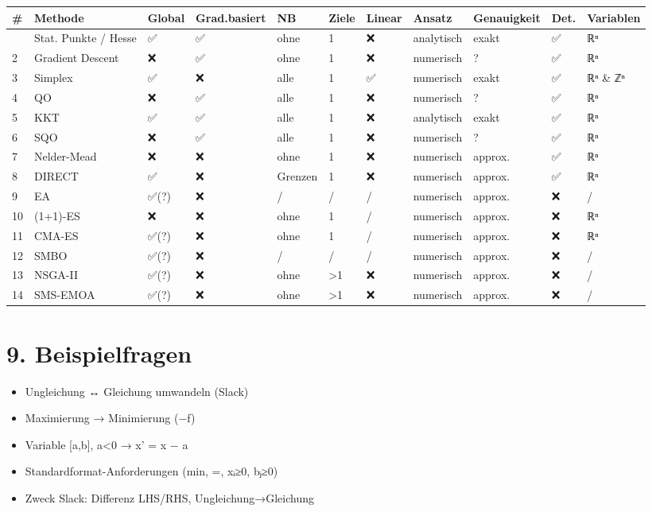 \documentclass[11pt, a4paper]{article}
\begin{document}
\begin{landscape}

{\scriptsize
\begin{tabularx}{\linewidth}{XXXXXXXXXXX}
\hline
\rowcolor{tableheadbg}
{\color{white}\textbf{\#}} & {\color{white}\textbf{Methode}} & {\color{white}\textbf{Global}} & {\color{white}\textbf{Grad.basiert}} & {\color{white}\textbf{NB}} & {\color{white}\textbf{Ziele}} & {\color{white}\textbf{Linear}} & {\color{white}\textbf{Ansatz}} & {\color{white}\textbf{Genauigkeit}} & {\color{white}\textbf{Det.}} & {\color{white}\textbf{Variablen}} \\[2pt]
\hline
\endhead
\hline
\endfoot
1 & Stat. Punkte / Hesse & ✅ & ✅ & ohne & 1 & ❌ & analytisch & exakt & ✅ & ℝⁿ \\
2 & Gradient Descent & ❌ & ✅ & ohne & 1 & ❌ & numerisch & ? & ✅ & ℝⁿ \\
3 & Simplex & ✅ & ❌ & alle & 1 & ✅ & numerisch & exakt & ✅ & ℝⁿ \& ℤⁿ \\
4 & QO & ❌ & ✅ & alle & 1 & ❌ & numerisch & ? & ✅ & ℝⁿ \\
5 & KKT & ✅ & ✅ & alle & 1 & ❌ & analytisch & exakt & ✅ & ℝⁿ \\
6 & SQO & ❌ & ✅ & alle & 1 & ❌ & numerisch & ? & ✅ & ℝⁿ \\
7 & Nelder-Mead & ❌ & ❌ & ohne & 1 & ❌ & numerisch & approx. & ✅ & ℝⁿ \\
8 & DIRECT & ✅ & ❌ & Grenzen & 1 & ❌ & numerisch & approx. & ✅ & ℝⁿ \\
9 & EA & ✅(?) & ❌ & / & / & / & numerisch & approx. & ❌ & / \\
10 & (1+1)-ES & ❌ & ❌ & ohne & 1 & / & numerisch & approx. & ❌ & ℝⁿ \\
11 & CMA-ES & ✅(?) & ❌ & ohne & 1 & / & numerisch & approx. & ❌ & ℝⁿ \\
12 & SMBO & ✅(?) & ❌ & / & / & / & numerisch & approx. & ❌ & / \\
13 & NSGA-II & ✅(?) & ❌ & ohne & >1 & ❌ & numerisch & approx. & ❌ & / \\
14 & SMS-EMOA & ✅(?) & ❌ & ohne & >1 & ❌ & numerisch & approx. & ❌ & / \\
\end{tabularx}
}
\end{landscape}



\section{9. Beispielfragen}

\begin{itemize}
  \item Ungleichung ↔ Gleichung umwandeln (Slack)
  \item Maximierung → Minimierung (−f)
  \item Variable [a,b], a<0 → x' = x − a
  \item Standardformat-Anforderungen (min, =, xᵢ≥0, bⱼ≥0)
  \item Zweck Slack: Differenz LHS/RHS, Ungleichung→Gleichung
\end{itemize}




\end{document}
